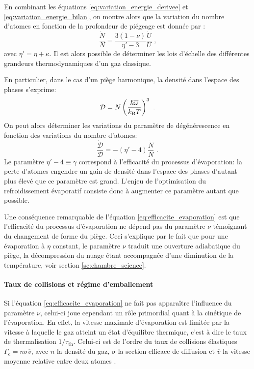 En combinant les équations \ref{eq:variation_energie_derivee} et \ref{eq:variation_energie_bilan}, on montre alors que la variation du nombre d'atomes en fonction de la profondeur de piégeage est donnée par \citep{o2001scaling}:
\begin{equation}
\frac{\dot{N}}{N}={\frac{3(1-\nu)}{\eta'-3}} \frac{\dot{U}}{U} \text{ ,}
\label{eq:nombre_atome_evap}
\end{equation}
avec $\eta'=\eta+\kappa$. Il est alors possible de déterminer les lois d'échelle des différentes grandeurs thermodynamiques d'un gaz classique. 

En particulier, dans le cas d'un piège harmonique, la densité dans l'espace des phases s'exprime:
\begin{equation}
\mathcal{D}=N\left(\frac{\hslash \overline{\omega}}{k_{\mathrm{B}} T}\right)^3 \text{ .}
\end{equation}
On peut alors déterminer les variations du paramètre de dégénérescence en fonction des variations du nombre d'atomes: 
\begin{equation}
\frac{\dot{\mathcal{D}}}{\mathcal{D}} = -(\eta'-4) \frac{\dot{N}}{N} \text{ .}
\label{eq:efficacite_evaporation}
\end{equation}
Le paramètre $\eta'-4 \equiv \gamma$ correspond à l'efficacité du processus d'évaporation: la perte d'atomes engendre un gain de densité dans l'espace des phases d'autant plus élevé que ce paramètre est grand. L'enjeu de l'optimisation du refroidissement évaporatif consiste donc à augmenter ce paramètre autant que possible.

Une conséquence remarquable de l'équation \ref{eq:efficacite_evaporation} est que l'efficacité du processus d'évaporation ne dépend pas du paramètre $\nu$ témoignant du changement de forme du piège. Ceci s'explique par le fait que pour une évaporation à $\eta$ constant, le paramètre $\nu$ traduit une ouverture adiabatique du piège, la décompression du nuage étant accompagnée d'une diminution de la température, voir section \ref{sc:chambre_science}. 


\paragraph*{Taux de collisions et régime d'emballement}
Si l'équation \ref{eq:efficacite_evaporation} ne fait pas apparaître l'influence du paramètre $\nu$, celui-ci joue cependant un rôle primordial quant à la cinétique de l'évaporation. En effet, la vitesse maximale d'évaporation est limitée par la vitesse à laquelle le gaz atteint un état d'équilibre thermique, c'est à dire le taux de thermalisation $1/\tau_{\mathrm{th}}$. Celui-ci est de l'ordre du taux de collisions élastiques $\Gamma_{\mathrm{c}}=n \sigma \overline{v}$, avec $n$ la densité du gaz, $\sigma$ la section efficace de diffusion et $\overline{v}$ la vitesse moyenne relative entre deux atomes \citep{walraven2010elements}. 

